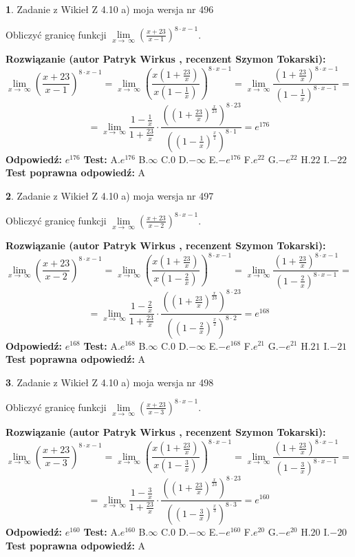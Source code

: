 \documentclass[12pt, a4paper]{article}
\theoremstyle{definition} %
\newtheorem{zad}{}
\newcommand{\zadStart}[1]{\begin{zad}#1\newline}
\newcommand{\zadStop}{\end{zad}}
\newcommand{\rozwStart}[2]{\noindent \textbf{Rozwiązanie (autor #1 , recenzent #2): }\newline}
\newcommand{\rozwStop}{\newline}
\newcommand{\odpStart}{\noindent \textbf{Odpowiedź:}\newline}
\newcommand{\odpStop}{\newline}
\newcommand{\testStart}{\noindent \textbf{Test:}\newline}
\newcommand{\testStop}{\newline}
\newcommand{\kluczStart}{\noindent \textbf{Test poprawna odpowiedź:}\newline}
\newcommand{\kluczStop}{\newline}
\begin{document}
\zadStart{Zadanie z Wikieł Z 4.10 a) moja wersja nr 496}

Obliczyć granicę funkcji  $\lim\limits_{x\to\ \infty}(\frac{x+23}{x-1})^{8\cdot x-1}$.
\zadStop
\rozwStart{Patryk Wirkus}{Szymon Tokarski}
$$\lim\limits_{x\to\ \infty}(\frac{x+23}{x-1})^{8\cdot x-1} = \lim\limits_{x\to\ \infty}(\frac{x(1+\frac{23}{x})}{x(1-\frac{1}{x})})^{8\cdot x-1}=\lim\limits_{x\to\ \infty}\frac{(1+\frac{23}{x})^{8\cdot x-1}}{(1-\frac{1}{x})^{8\cdot x-1}}=$$
$$=\lim\limits_{x\to\ \infty}\frac{1-\frac{1}{x}}{1+\frac{23}{x}}\cdot\frac{((1+\frac{23}{x})^{\frac{x}{23}})^{8\cdot23}}{((1-\frac{1}{x})^{\frac{x}{1}})^{8\cdot1}}=e^{176}$$
\rozwStop
\odpStart
$e^{176}$
\odpStop
\testStart
A.$e^{176}$ B.$\infty$ C.$0$ D.$-\infty$ E.$-e^{176}$
F.$e^{22}$ G.$-e^{22}$
H.$22$
I.$-22$
\testStop
\kluczStart
A
\kluczStop



\zadStart{Zadanie z Wikieł Z 4.10 a) moja wersja nr 497}

Obliczyć granicę funkcji  $\lim\limits_{x\to\ \infty}(\frac{x+23}{x-2})^{8\cdot x-1}$.
\zadStop
\rozwStart{Patryk Wirkus}{Szymon Tokarski}
$$\lim\limits_{x\to\ \infty}(\frac{x+23}{x-2})^{8\cdot x-1} = \lim\limits_{x\to\ \infty}(\frac{x(1+\frac{23}{x})}{x(1-\frac{2}{x})})^{8\cdot x-1}=\lim\limits_{x\to\ \infty}\frac{(1+\frac{23}{x})^{8\cdot x-1}}{(1-\frac{2}{x})^{8\cdot x-1}}=$$
$$=\lim\limits_{x\to\ \infty}\frac{1-\frac{2}{x}}{1+\frac{23}{x}}\cdot\frac{((1+\frac{23}{x})^{\frac{x}{23}})^{8\cdot23}}{((1-\frac{2}{x})^{\frac{x}{2}})^{8\cdot2}}=e^{168}$$
\rozwStop
\odpStart
$e^{168}$
\odpStop
\testStart
A.$e^{168}$ B.$\infty$ C.$0$ D.$-\infty$ E.$-e^{168}$
F.$e^{21}$ G.$-e^{21}$
H.$21$
I.$-21$
\testStop
\kluczStart
A
\kluczStop



\zadStart{Zadanie z Wikieł Z 4.10 a) moja wersja nr 498}

Obliczyć granicę funkcji  $\lim\limits_{x\to\ \infty}(\frac{x+23}{x-3})^{8\cdot x-1}$.
\zadStop
\rozwStart{Patryk Wirkus}{Szymon Tokarski}
$$\lim\limits_{x\to\ \infty}(\frac{x+23}{x-3})^{8\cdot x-1} = \lim\limits_{x\to\ \infty}(\frac{x(1+\frac{23}{x})}{x(1-\frac{3}{x})})^{8\cdot x-1}=\lim\limits_{x\to\ \infty}\frac{(1+\frac{23}{x})^{8\cdot x-1}}{(1-\frac{3}{x})^{8\cdot x-1}}=$$
$$=\lim\limits_{x\to\ \infty}\frac{1-\frac{3}{x}}{1+\frac{23}{x}}\cdot\frac{((1+\frac{23}{x})^{\frac{x}{23}})^{8\cdot23}}{((1-\frac{3}{x})^{\frac{x}{3}})^{8\cdot3}}=e^{160}$$
\rozwStop
\odpStart
$e^{160}$
\odpStop
\testStart
A.$e^{160}$ B.$\infty$ C.$0$ D.$-\infty$ E.$-e^{160}$
F.$e^{20}$ G.$-e^{20}$
H.$20$
I.$-20$
\testStop
\kluczStart
A
\kluczStop
\end{document}
